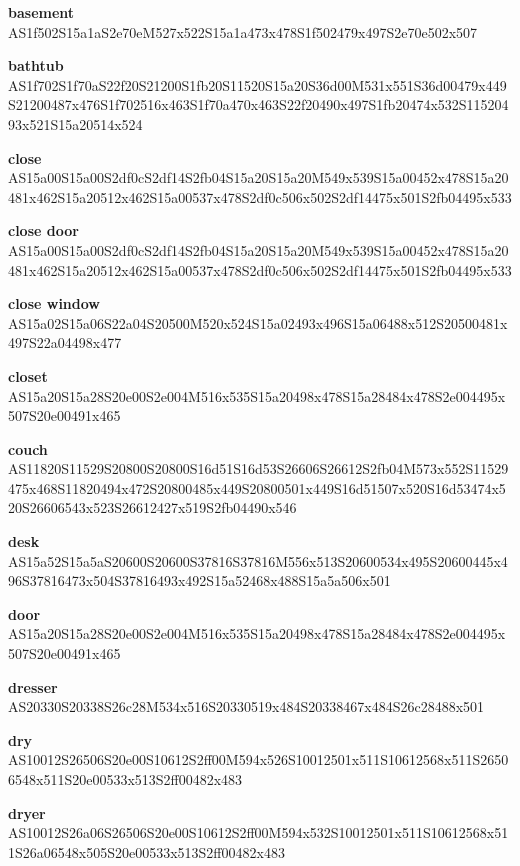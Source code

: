 \documentclass{article}
\begin{document}
\begin{glossary}

\textbf{basement}\\
AS1f502S15a1aS2e70eM527x522S15a1a473x478S1f502479x497S2e70e502x507

\textbf{bathtub}\\
AS1f702S1f70aS22f20S21200S1fb20S11520S15a20S36d00M531x551S36d00479x449S21200487x476S1f702516x463S1f70a470x463S22f20490x497S1fb20474x532S11520493x521S15a20514x524

\textbf{close}\\
AS15a00S15a00S2df0cS2df14S2fb04S15a20S15a20M549x539S15a00452x478S15a20481x462S15a20512x462S15a00537x478S2df0c506x502S2df14475x501S2fb04495x533

\textbf{close door}\\
AS15a00S15a00S2df0cS2df14S2fb04S15a20S15a20M549x539S15a00452x478S15a20481x462S15a20512x462S15a00537x478S2df0c506x502S2df14475x501S2fb04495x533

\textbf{close window}\\
AS15a02S15a06S22a04S20500M520x524S15a02493x496S15a06488x512S20500481x497S22a04498x477

\textbf{closet}\\
AS15a20S15a28S20e00S2e004M516x535S15a20498x478S15a28484x478S2e004495x507S20e00491x465

\textbf{couch}\\
AS11820S11529S20800S20800S16d51S16d53S26606S26612S2fb04M573x552S11529475x468S11820494x472S20800485x449S20800501x449S16d51507x520S16d53474x520S26606543x523S26612427x519S2fb04490x546

\textbf{desk}\\
AS15a52S15a5aS20600S20600S37816S37816M556x513S20600534x495S20600445x496S37816473x504S37816493x492S15a52468x488S15a5a506x501

\textbf{door}\\
AS15a20S15a28S20e00S2e004M516x535S15a20498x478S15a28484x478S2e004495x507S20e00491x465

\textbf{dresser}\\
AS20330S20338S26c28M534x516S20330519x484S20338467x484S26c28488x501

\textbf{dry}\\
AS10012S26506S20e00S10612S2ff00M594x526S10012501x511S10612568x511S26506548x511S20e00533x513S2ff00482x483

\textbf{dryer}\\
AS10012S26a06S26506S20e00S10612S2ff00M594x532S10012501x511S10612568x511S26a06548x505S20e00533x513S2ff00482x483


\end{glossary}
\end{document}
